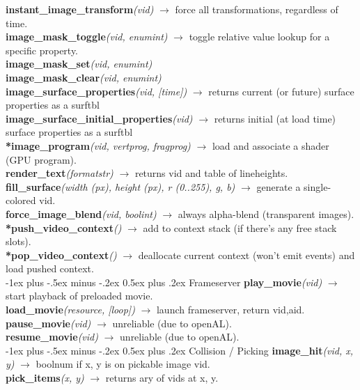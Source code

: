 \documentclass[10pt,landscape]{article}
\makeatletter
\renewcommand{\section}{\@startsection{section}{1}{0mm}%
                                {-1ex plus -.5ex minus -.2ex}%
                                {0.5ex plus .2ex}%
                                {\normalfont\large\bfseries}}
\makeatother
\begin{document}
\begin{multicols}{3}
{	\textbf{instant\_image\_transform}\emph{(vid)} $\rightarrow$ force all transformations, regardless of time.\\
	\textbf{image\_mask\_toggle}\emph{(vid, enumint)} $\rightarrow$ toggle relative value lookup for a specific property.\\
	\textbf{image\_mask\_set}\emph{(vid, enumint)}\\
	\textbf{image\_mask\_clear}\emph{(vid, enumint)}\\
	\textbf{image\_surface\_properties}\emph{(vid, [time])} $\rightarrow$ returns current (or future) surface properties as a surftbl\\
	\textbf{image\_surface\_initial\_properties}\emph{(vid)} $\rightarrow$ returns initial (at load time) surface properties as a surftbl\\
	\textbf{*image\_program}\emph{(vid, vertprog, fragprog)} $\rightarrow$ load and associate a shader (GPU program).\\
	\textbf{render\_text}\emph{(formatstr)} $\rightarrow$ returns vid and table of lineheights.\\
	\textbf{fill\_surface}\emph{(width (px), height (px), r (0..255), g, b)} $\rightarrow$ generate a single-colored vid.\\
	\textbf{force\_image\_blend}\emph{(vid, boolint)} $\rightarrow$ always alpha-blend (transparent images).\\
	\textbf{*push\_video\_context}\emph{()} $\rightarrow$ add to context stack (if there's any free stack slots).\\
	\textbf{*pop\_video\_context}\emph{()} $\rightarrow$ deallocate current context (won't emit events) and load pushed context.\\

\section{Frameserver}
	\textbf{play\_movie}\emph{(vid)} $\rightarrow$ start playback of preloaded movie.\\
	\textbf{load\_movie}\emph{(resource, [loop])} $\rightarrow$ launch frameserver, return vid,aid. \\
	\textbf{pause\_movie}\emph{(vid)} $\rightarrow$ unreliable (due to openAL). \\
	\textbf{resume\_movie}\emph{(vid)} $\rightarrow$ unreliable (due to openAL). \\
	
\section{Collision / Picking}
	\textbf{image\_hit}\emph{(vid, x, y)} $\rightarrow$ boolnum if x, y is on pickable image vid.\\
	\textbf{pick\_items}\emph{(x, y)} $\rightarrow$ returns ary of vids at x, y.\\

}
\end{multicols}
\end{document}
